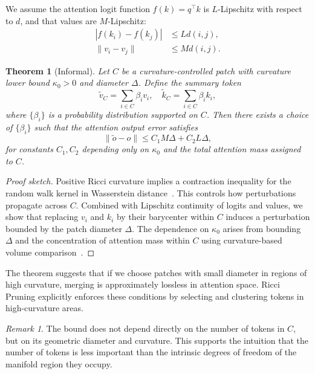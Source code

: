 \documentclass{article}
\theoremstyle{plain}
\newtheorem{theorem}{Theorem}
\theoremstyle{definition}
\theoremstyle{remark}
\newtheorem{remark}{Remark}
\begin{document}
We assume the attention logit function $f(k) = q^\top k$ is $L$-Lipschitz with respect to $d$, and that values are $M$-Lipschitz:
\begin{align}
  |f(k_i)-f(k_j)| &\le L d(i,j), \\
  \|v_i-v_j\| &\le M d(i,j).
\end{align}

\begin{theorem}[Informal]
\label{thm:curvature-bound}
Let $C$ be a curvature-controlled patch with curvature lower bound $\kappa_0>0$ and diameter $\Delta$. Define the summary token
\begin{equation}
  \tilde{v}_C = \sum_{i\in C} \beta_i v_i, \quad
  \tilde{k}_C = \sum_{i\in C} \beta_i k_i,
\end{equation}
where $\{\beta_i\}$ is a probability distribution supported on $C$. Then there exists a choice of $\{\beta_i\}$ such that the attention output error satisfies
\begin{equation}
  \|\tilde{o} - o\|
  \le C_1 M \Delta + C_2 L \Delta,
\end{equation}
for constants $C_1,C_2$ depending only on $\kappa_0$ and the total attention mass assigned to $C$.
\end{theorem}

\begin{proof}[Proof sketch]
Positive Ricci curvature implies a contraction inequality for the random walk kernel in Wasserstein distance~\citep{ollivier2009ricci}. This controls how perturbations propagate across $C$. Combined with Lipschitz continuity of logits and values, we show that replacing $v_i$ and $k_i$ by their barycenter within $C$ induces a perturbation bounded by the patch diameter $\Delta$. The dependence on $\kappa_0$ arises from bounding $\Delta$ and the concentration of attention mass within $C$ using curvature-based volume comparison~\citep{villani2009optimal,yadav2025roadmap}.
\end{proof}

The theorem suggests that if we choose patches with small diameter in regions of high curvature, merging is approximately lossless in attention space. Ricci Pruning explicitly enforces these conditions by selecting and clustering tokens in high-curvature areas.

\begin{remark}
The bound does not depend directly on the number of tokens in $C$, but on its geometric diameter and curvature. This supports the intuition that the number of tokens is less important than the intrinsic degrees of freedom of the manifold region they occupy.
\end{remark}
\end{document}
